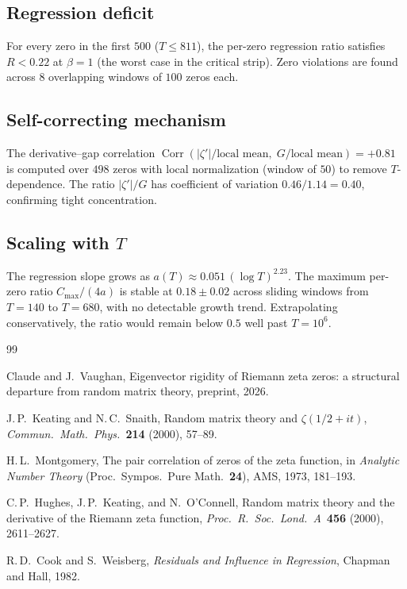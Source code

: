 \documentclass[11pt,a4paper]{article}
\DeclareMathOperator{\Corr}{Corr}
\begin{document}
\subsection{Regression deficit}
For every zero in the first $500$ ($T \leq 811$), the per-zero regression ratio satisfies $R < 0.22$ at $\beta = 1$ (the worst case in the critical strip).
Zero violations are found across $8$ overlapping windows of $100$ zeros each.

\subsection{Self-correcting mechanism}
The derivative--gap correlation $\Corr(|\zeta'|/\text{local mean},\; G/\text{local mean}) = +0.81$ is computed over $498$ zeros with local normalization (window of $50$) to remove $T$-dependence.
The ratio $|\zeta'|/G$ has coefficient of variation $0.46/1.14 = 0.40$, confirming tight concentration.

\subsection{Scaling with $T$}
The regression slope grows as $a(T) \approx 0.051\,(\log T)^{2.23}$.
The maximum per-zero ratio $C_{\max}/(4a)$ is stable at $0.18 \pm 0.02$ across sliding windows from $T = 140$ to $T = 680$, with no detectable growth trend.
Extrapolating conservatively, the ratio would remain below $0.5$ well past $T = 10^{6}$.


\begin{thebibliography}{99}

Claude and J.~Vaughan,
Eigenvector rigidity of Riemann zeta zeros: a structural departure from random matrix theory,
preprint, 2026.

J.\,P.~Keating and N.\,C.~Snaith,
Random matrix theory and $\zeta(1/2+it)$,
\emph{Commun.\ Math.\ Phys.}\ \textbf{214} (2000), 57--89.

H.\,L.~Montgomery,
The pair correlation of zeros of the zeta function,
in \emph{Analytic Number Theory} (Proc.\ Sympos.\ Pure Math.\ \textbf{24}), AMS, 1973, 181--193.

C.\,P.~Hughes, J.\,P.~Keating, and N.~O'Connell,
Random matrix theory and the derivative of the Riemann zeta function,
\emph{Proc.\ R.\ Soc.\ Lond.\ A}\ \textbf{456} (2000), 2611--2627.

R.\,D.~Cook and S.~Weisberg,
\emph{Residuals and Influence in Regression},
Chapman and Hall, 1982.

\end{thebibliography}
\end{document}

